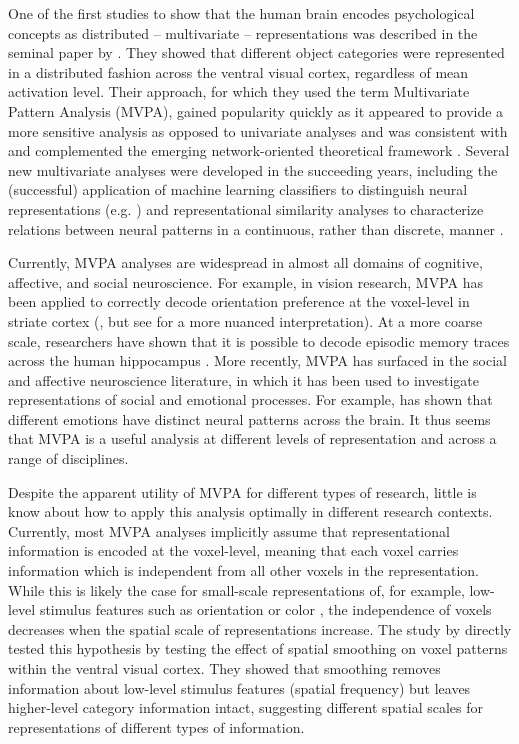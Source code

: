\documentclass[12pt,a4paper]{article}\usepackage[]{graphicx}\usepackage[]{color}
\begin{document}
One of the first studies to show that the human brain encodes psychological concepts as distributed -- multivariate -- representations was described in the seminal paper by \cite{haxby2001}. They showed that different object categories were represented in a distributed fashion across the ventral visual cortex, regardless of mean activation level. Their approach, for which they used the term Multivariate Pattern Analysis (MVPA), gained popularity quickly as it appeared to provide a more sensitive analysis as opposed to univariate analyses \citep{norman2006,mahmoudi2012} and was consistent with and complemented the emerging network-oriented theoretical framework \citep{bressler2010}. Several new multivariate analyses were developed in the succeeding years, including the (successful) application of machine learning classifiers to distinguish neural representations (e.g. \citealp{cox2003}) and representational similarity analyses to characterize relations between neural patterns in a continuous, rather than discrete, manner \citep{kriegeskorte2008}. 

Currently, MVPA analyses are widespread in almost all domains of cognitive, affective, and social neuroscience. For example, in vision research, MVPA has been applied to correctly decode orientation preference at the voxel-level in striate cortex (\citealp{kamitani2005}, but see \citealp{opdebeeck2010} for a more nuanced interpretation). At a more coarse scale, researchers have shown that it is possible to decode episodic memory traces across the human hippocampus \citep{chadwick2010}. More recently, MVPA has surfaced in the social and affective neuroscience literature, in which it has been used to investigate representations of social and emotional processes. For example, \cite{kassam2013} has shown that different emotions have distinct neural patterns across the brain. It thus seems that MVPA is a useful analysis at different levels of representation and across a range of disciplines.     

Despite the apparent utility of MVPA for different types of research, little is know about how to apply this analysis optimally in different research contexts. Currently, most MVPA analyses implicitly assume that representational information is encoded at the voxel-level, meaning that each voxel carries information which is independent from all other voxels in the representation. While this is likely the case for small-scale representations of, for example, low-level stimulus features such as orientation \cite{kamitani2005} or color \citep{brouwer2009}, the independence of voxels decreases when the spatial scale of representations increase. The study by \cite{brants2011} directly tested this hypothesis by testing the effect of spatial smoothing on voxel patterns within the ventral visual cortex. They showed that smoothing removes information about low-level stimulus features (spatial frequency) but leaves higher-level category information intact, suggesting different spatial scales for representations of different types of information.              
\end{document}
